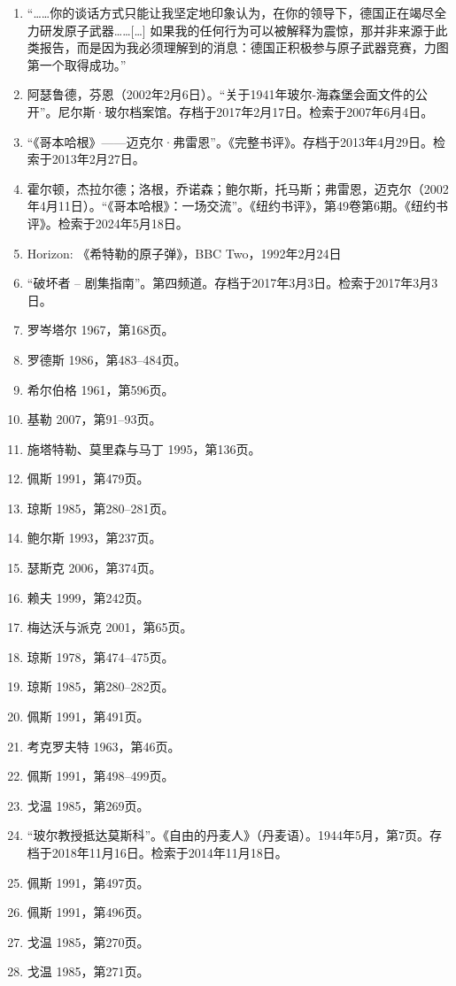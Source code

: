 \begin{enumerate}
\item “……你的谈话方式只能让我坚定地印象认为，在你的领导下，德国正在竭尽全力研发原子武器……[…] 如果我的任何行为可以被解释为震惊，那并非来源于此类报告，而是因为我必须理解到的消息：德国正积极参与原子武器竞赛，力图第一个取得成功。”
\item 阿瑟鲁德，芬恩（2002年2月6日）。“关于1941年玻尔-海森堡会面文件的公开”。尼尔斯·玻尔档案馆。存档于2017年2月17日。检索于2007年6月4日。
\item “《哥本哈根》——迈克尔·弗雷恩”。《完整书评》。存档于2013年4月29日。检索于2013年2月27日。
\item 霍尔顿，杰拉尔德；洛根，乔诺森；鲍尔斯，托马斯；弗雷恩，迈克尔（2002年4月11日）。“《哥本哈根》：一场交流”。《纽约书评》，第49卷第6期。《纽约书评》。检索于2024年5月18日。
\item Horizon: 《希特勒的原子弹》，BBC Two，1992年2月24日
\item “破坏者 – 剧集指南”。第四频道。存档于2017年3月3日。检索于2017年3月3日。
\item 罗岑塔尔 1967，第168页。
\item 罗德斯 1986，第483–484页。
\item 希尔伯格 1961，第596页。
\item 基勒 2007，第91–93页。
\item 施塔特勒、莫里森与马丁 1995，第136页。
\item 佩斯 1991，第479页。
\item 琼斯 1985，第280–281页。
\item 鲍尔斯 1993，第237页。
\item 瑟斯克 2006，第374页。
\item 赖夫 1999，第242页。
\item 梅达沃与派克 2001，第65页。
\item 琼斯 1978，第474–475页。
\item 琼斯 1985，第280–282页。
\item 佩斯 1991，第491页。
\item 考克罗夫特 1963，第46页。
\item 佩斯 1991，第498–499页。
\item 戈温 1985，第269页。
\item “玻尔教授抵达莫斯科”。《自由的丹麦人》（丹麦语）。1944年5月，第7页。存档于2018年11月16日。检索于2014年11月18日。
\item 佩斯 1991，第497页。
\item 佩斯 1991，第496页。
\item 戈温 1985，第270页。
\item 戈温 1985，第271页。

\end{enumerate}
